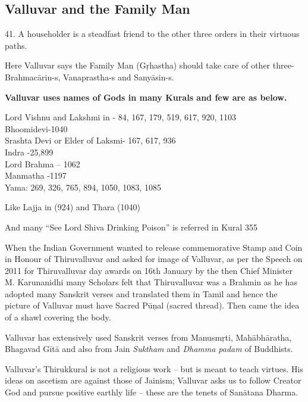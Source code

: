\subsection*{Valluvar and the Family Man}

41. A householder is a steadfast friend to the other three orders in their virtuous paths.

Here Valluvar says the Family Man (Gŗhastha) should take care of other three- Brahmacārin-s, Vanaprastha-s and Sanyāsin-s.

\textbf{Valluvar uses names of Gods in many Kurals and few are as below.}

Lord Vishnu and Lakshmi in - 84, 167, 179, 519, 617, 920, 1103\\ Bhoomidevi-1040\\ Srashta Devi or Elder of Laksmi- 167, 617, 936\\ Indra -25,899\\ Lord Brahma – 1062\\ Manmatha -1197\\ Yama: 269, 326, 765, 894, 1050, 1083, 1085

Like Lajja in  (924) and Thara  (1040)

And many “See Lord Shiva Drinking Poison” is referred in Kural 355

When the Indian Government wanted to release commemorative Stamp and Coin in Honour of Thiruvalluvar and asked for image of Valluvar, as per the Speech on 2011 for Thiruvalluvar day awards on 16th January by the then Chief Minister M. Karunanidhi many Scholars felt that Thiruvalluvar was a Brahmin as he has adopted many Sanskrit verses and translated them in Tamil and hence the picture of Valluvar must have Sacred Pūņal (sacred thread). Then came the idea of a shawl covering the body.

Valluvar has extensively used Sanskrit verses from Manusmŗti, Mahābhāratha, Bhagavad Gītā and also from Jain \textit{Suktham} and \textit{Dhamma padam} of Buddhists.

Valluvar’s Thirukkural is not a religious work – but is meant to teach virtues. His ideas on ascetism are against those of Jainism; Valluvar asks us to follow Creator God and pursue positive earthly life -- these are the tenets of Sanātana Dharma.

\newpage

\theendnotes

